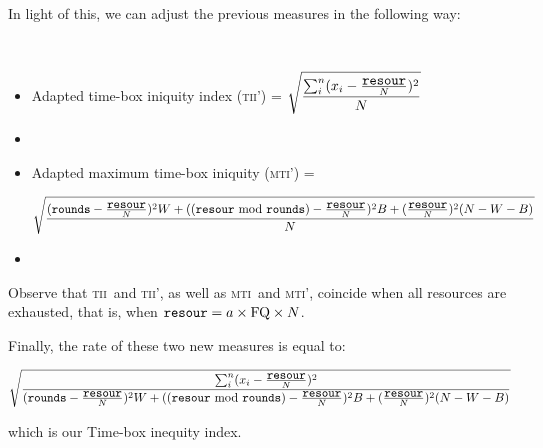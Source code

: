 \documentclass{minimal}
\newcommand{\tii}{\textsc{tii}}
\newcommand{\mti}{\textsc{mti}}
\newcommand{\FQ}{\mbox{FQ}}
\newcommand{\R}{\mbox{\texttt{resour}}}
\newcommand{\ro}{\mbox{\texttt{rounds}}}
\begin{document}
In light of this, we can adjust the previous measures in the following way:

\

\begin{itemize}
\item[] Adapted time-box iniquity index (\tii') = $\displaystyle{\sqrt{\frac{\sum_i^n(x_i-\frac{\R}{N})^2}{N}}}$
\item[]
\item[] Adapted maximum time-box iniquity (\mti') = 

$$\displaystyle{\sqrt{\frac{(\ro - \frac{\R}{N})^2W+((\R\ \mbox{mod } \ro) -  \frac{\R}{N})^2B  +  (\frac{\R}{N})^2(N-W-B)}{N}}}$$
\item[]
\end{itemize}

Observe that \tii\ and \tii', as well as \mti\ and \mti', coincide when all resources are exhausted, that is, when $\R=a\times\FQ\times N$.

Finally, the rate of these two new measures is equal to:

\[
\sqrt{\frac{\sum_i^n(x_i-\frac{\R}{N})^2}{(\ro - \frac{\R}{N})^2W+((\R\ \mbox{mod } \ro) -  \frac{\R}{N})^2B  +  (\frac{\R}{N})^2(N-W-B)}}
\]

which is our Time-box inequity index. 
\end{document}
